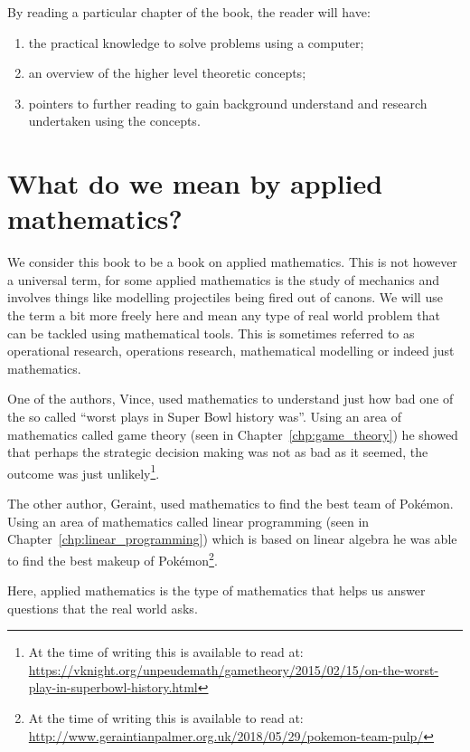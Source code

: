 By reading a particular chapter of the book, the reader will have:

\begin{enumerate}
  \item the practical knowledge to solve problems using a computer;
  \item an overview of the higher level theoretic concepts;
  \item pointers to further reading to gain background understand and research
        undertaken using the concepts.
\end{enumerate}

\section{What do we mean by applied mathematics?}\label{sec:what-do-we-mean-by-applied-mathematics}

We consider this book to be a book on applied mathematics. This is not
however a universal term, for some applied mathematics is the study of
mechanics and involves things like modelling projectiles being fired out of canons.
We will use the term a bit more freely here and mean any type of real
world problem that can be tackled using mathematical tools. This is
sometimes referred to as operational research,
operations research, mathematical modelling or indeed just mathematics.

One of the authors, Vince, used mathematics to understand just how bad one of
the so called ``worst plays in Super Bowl history was''. Using
an area of mathematics called game theory (seen in
Chapter~\ref{chp:game_theory}) he showed that perhaps the strategic decision
making was not as bad as it seemed, the outcome was just unlikely\footnote{At
the time of writing this is available to read at:
\url{https://vknight.org/unpeudemath/gametheory/2015/02/15/on-the-worst-play-in-superbowl-history.html}}.

The other author, Geraint, used mathematics to find the best team of
Pokémon. Using an area of mathematics called linear
programming (seen in
Chapter~\ref{chp:linear_programming}) which is based on linear algebra he was
able to find the best makeup of Pokémon\footnote{At the time of writing this is
available to read at:
\url{http://www.geraintianpalmer.org.uk/2018/05/29/pokemon-team-pulp/}}.

Here, applied mathematics is the type of mathematics that helps us
answer questions that the real world asks.

